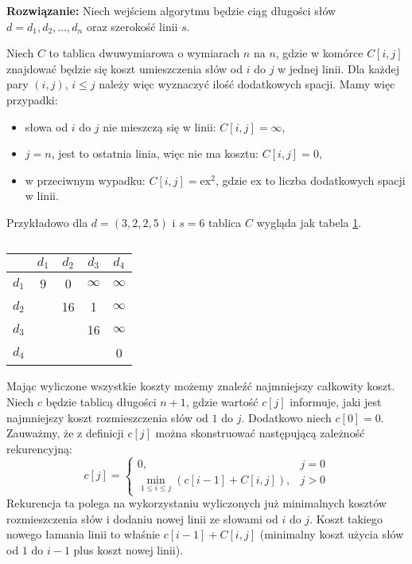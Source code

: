 \textbf{Rozwiązanie:} Niech wejściem algorytmu będzie ciąg  długości słów $d=d_1,d_2,\dotsc,d_n$ oraz szerokość linii $s$.

Niech $C$ to tablica dwuwymiarowa o wymiarach $n$ na $n$, gdzie w komórce $C[i,j]$ znajdować będzie się koszt umieszczenia słów od $i$ do $j$ w jednej linii. Dla każdej pary $(i,j)$, $i\leq j$ należy więc wyznaczyć ilość dodatkowych spacji. Mamy więc przypadki: \begin{itemize}
	\item słowa od $i$ do $j$ nie mieszczą się w linii: $C[i,j]=\infty$,
	\item $j=n$, jest to ostatnia linia, więc nie ma kosztu: $C[i,j]=0$,
	\item w przeciwnym wypadku: $C[i,j]=\textrm{ex}^2$, gdzie $\textrm{ex}$ to liczba dodatkowych spacji w linii.
\end{itemize}

Przykładowo dla $d=(3,2,2,5)$ i $s=6$ tablica $C$ wygląda jak tabela \ref{tab_zad13_C}.
\begin{table}[H]
	\centering
	\def\arraystretch{1.25}
	\begin{tabular}{|c|cccc|}
		\hline \diagbox{$j$}{$i$}
		& \multicolumn{1}{c|}{$d_1$} & \multicolumn{1}{c|}{$d_2$} & \multicolumn{1}{c|}{$d_3$} & \multicolumn{1}{c|}{$d_4$} \\ \hline
		$d_1$ & 9 & 0  & $\infty$ & $\infty$ \\ \cline{1-1}
		$d_2$ &   & 16 &        1 & $\infty$ \\ \cline{1-1}
		$d_3$ &   &    &       16 & $\infty$ \\ \cline{1-1}
		$d_4$ &   &    &          &        0 \\ \cline{1-1}
		\hline
	\end{tabular}
	\caption{}
	\label{tab_zad13_C}
\end{table}

Mając wyliczone wszystkie koszty możemy znaleźć najmniejszy całkowity koszt. Niech $c$ będzie tablicą długości $n+1$, gdzie wartość $c[j]$ informuje, jaki jest najmniejszy koszt rozmieszczenia słów od $1$ do $j$. Dodatkowo niech $c[0]=0$. Zauważmy, że z definicji $c[j]$ można skonstruować następującą zależność rekurencyjną: \[
	c[j]=\begin{cases}
		0, &j=0\\
		\min\limits_{1 \leq i \leq j}\left(c[i-1]+C[i,j]\right), &j>0
	\end{cases}
\]
Rekurencja ta polega na wykorzystaniu wyliczonych już minimalnych kosztów rozmieszczenia słów i dodaniu nowej linii ze słowami od $i$ do $j$. Koszt takiego nowego łamania linii to właśnie $c[i-1] + C[i,j]$ (minimalny koszt użycia słów od $1$ do $i-1$ plus koszt nowej linii).

